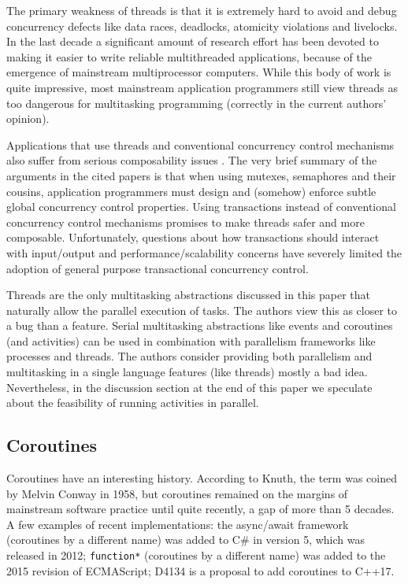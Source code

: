 \documentclass[10pt,preprint]{sigplanconf}
\begin{document}
The primary weakness of threads is that it is extremely hard to avoid and debug concurrency defects like data races, deadlocks, atomicity violations and livelocks.
In the last decade a significant amount of research effort has been devoted to making it easier to write reliable multithreaded applications, because of the emergence of mainstream multiprocessor computers.
While this body of work is quite impressive, most mainstream application programmers still view threads as too dangerous for multitasking programming (correctly in the current authors' opinion).

Applications that use threads and conventional concurrency control mechanisms also suffer from serious composability issues \cite{Harris2005, Grossman2007}.
The very brief summary of the arguments in the cited papers is that when using mutexes, semaphores and their cousins, application programmers must design and (somehow) enforce subtle global concurrency control properties.
Using transactions instead of conventional concurrency control mechanisms promises to make threads safer and more composable.
Unfortunately, questions about how transactions should interact with input/output and performance/scalability concerns have severely limited the adoption of general purpose transactional concurrency control.

Threads are the only multitasking abstractions discussed in this paper that naturally allow the parallel execution of tasks.
The authors view this as closer to a bug than a feature.
Serial multitasking abstractions like events and coroutines (and activities) can be used in combination with parallelism frameworks like processes and threads.
The authors consider providing both parallelism and multitasking in a single language features (like threads) mostly a bad idea.
Nevertheless, in the discussion section at the end of this paper we speculate about the feasibility of running activities in parallel.

\subsection{Coroutines}

Coroutines have an interesting history.
According to Knuth, the term was coined by Melvin Conway in 1958, but coroutines remained on the margins of mainstream software practice until quite recently, a gap of more than 5 decades.
A few examples of recent implementations: the async/await framework (coroutines by a different name) was added to C\# in version 5, which was released in 2012; \texttt{function*} (coroutines by a different name) was added to the 2015 revision of ECMAScript; D4134 is a proposal to add coroutines to C++17.
\end{document}

